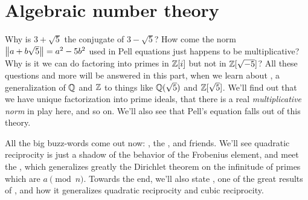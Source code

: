 \section{Algebraic number theory}
\begin{itemize}
Why is $3+\sqrt5$ the conjugate of $3-\sqrt5$?
How come the norm $\left\lVert a+b\sqrt5 \right\rVert = a^2-5b^2$ used in Pell equations
just happens to be multiplicative?
Why is it we can do factoring into primes in $\mathbb Z[i]$
but not in $\mathbb Z[\sqrt{-5}]$?
All these questions and more will be answered in this part,
when we learn about ,
a generalization of $\mathbb Q$ and $\mathbb Z$ to things like $\mathbb Q(\sqrt5)$
and $\mathbb Z[\sqrt{5}]$.
We'll find out that we have unique factorization into prime ideals,
that there is a real \emph{multiplicative norm} in play here,
and so on.
We'll also see that Pell's equation falls out of this theory.

All the big buzz-words come out now:
, the , and friends.
We'll see quadratic reciprocity is just a shadow of
the behavior of the Frobenius element,
and meet the ,
which generalizes greatly the Dirichlet theorem on the infinitude
of primes which are $a \pmod n$.
Towards the end, we'll also state ,
one of the great results of ,
and how it generalizes quadratic reciprocity and cubic reciprocity.
\end{itemize}

